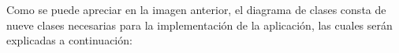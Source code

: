 \documentclass{memoria}
\begin{document}




Como se puede apreciar en la imagen anterior, el diagrama de clases consta de nueve clases necesarias para la implementación de la aplicación, las cuales serán explicadas a continuación:
\end{document}
